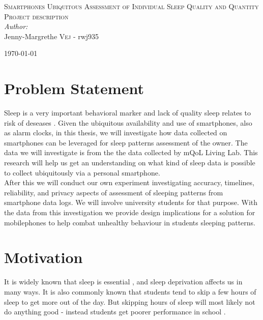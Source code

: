 \documentclass[12pt]{article}
\begin{document}

\begin{center}
\textsc{\Large Smartphones Ubiquitous Assessment of Individual Sleep Quality and Quantity}\\[0.5cm] 
\textsc{\large Project description}\\[0.5cm] 


\emph{Author:}
\\
Jenny-Margrethe \textsc{Vej} - rwj935\\ 
\vspace{10mm}

{\large \today}\\[3cm] 
\end{center}
\vspace{-20mm}

\section{Problem Statement}
Sleep is a very important behavioral marker and lack of quality sleep relates to risk of deseases
 \cite{Gumbiner2012}. Given the ubiquitous availability and use of smartphones, also as alarm 
 clocks, in this thesis, we will investigate how data collected on smartphones 
 can be leveraged for sleep patterns assessment of the owner. The data we will investigate is from the the data collected by  mQoL Living Lab\cite{mQOL}. This research will help us get an understanding on what kind of sleep data is possible to collect ubiquitously via a personal smartphone. \\

After this we will conduct our own experiment investigating accuracy, timelines, reliability, and privacy aspects of assessment of sleeping patterns from smartphone data logs. We will involve university students for that purpose. With the data from this investigation we provide design implications for a solution for mobilephones to help combat unhealthy behaviour in students sleeping patterns.

\section{Motivation}
It is widely known that sleep is essential \cite{Gumbiner2012}, and sleep deprivation affects 
us in many ways. It is also commonly known that students tend to skip a few hours of sleep to 
get more out of the day. But skipping hours of sleep will most likely not do anything good - instead
students get poorer performance in school \cite{Gilbert2010}. \\
\end{document}
